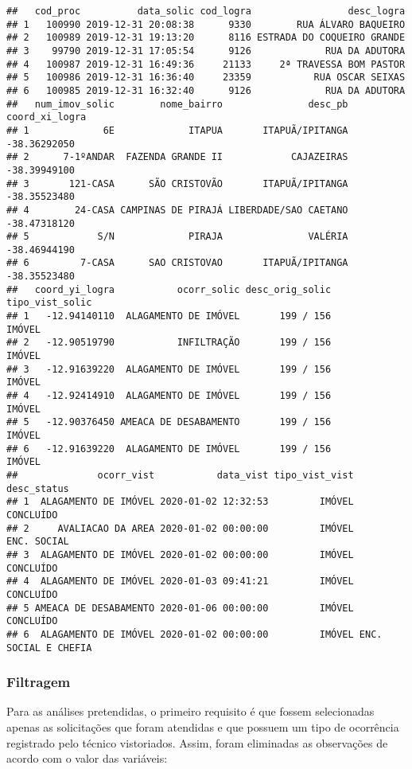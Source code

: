\documentclass[
]{article}
\begin{document}
\begin{verbatim}
##   cod_proc          data_solic cod_logra                 desc_logra
## 1   100990 2019-12-31 20:08:38      9330        RUA ÁLVARO BAQUEIRO
## 2   100989 2019-12-31 19:13:20      8116 ESTRADA DO COQUEIRO GRANDE
## 3    99790 2019-12-31 17:05:54      9126             RUA DA ADUTORA
## 4   100987 2019-12-31 16:49:36     21133     2ª TRAVESSA BOM PASTOR
## 5   100986 2019-12-31 16:36:40     23359           RUA OSCAR SEIXAS
## 6   100985 2019-12-31 16:32:40      9126             RUA DA ADUTORA
##   num_imov_solic        nome_bairro               desc_pb coord_xi_logra
## 1             6E             ITAPUA       ITAPUÃ/IPITANGA   -38.36292050
## 2      7-1ºANDAR  FAZENDA GRANDE II            CAJAZEIRAS   -38.39949100
## 3       121-CASA      SÃO CRISTOVÃO       ITAPUÃ/IPITANGA   -38.35523480
## 4        24-CASA CAMPINAS DE PIRAJÁ LIBERDADE/SAO CAETANO   -38.47318120
## 5            S/N             PIRAJA               VALÉRIA   -38.46944190
## 6         7-CASA      SAO CRISTOVAO       ITAPUÃ/IPITANGA   -38.35523480
##   coord_yi_logra           ocorr_solic desc_orig_solic tipo_vist_solic
## 1   -12.94140110  ALAGAMENTO DE IMÓVEL       199 / 156          IMÓVEL
## 2   -12.90519790           INFILTRAÇÃO       199 / 156          IMÓVEL
## 3   -12.91639220  ALAGAMENTO DE IMÓVEL       199 / 156          IMÓVEL
## 4   -12.92414910  ALAGAMENTO DE IMÓVEL       199 / 156          IMÓVEL
## 5   -12.90376450 AMEACA DE DESABAMENTO       199 / 156          IMÓVEL
## 6   -12.91639220  ALAGAMENTO DE IMÓVEL       199 / 156          IMÓVEL
##              ocorr_vist           data_vist tipo_vist_vist          desc_status
## 1  ALAGAMENTO DE IMÓVEL 2020-01-02 12:32:53         IMÓVEL            CONCLUÍDO
## 2     AVALIACAO DA AREA 2020-01-02 00:00:00         IMÓVEL          ENC. SOCIAL
## 3  ALAGAMENTO DE IMÓVEL 2020-01-02 00:00:00         IMÓVEL            CONCLUÍDO
## 4  ALAGAMENTO DE IMÓVEL 2020-01-03 09:41:21         IMÓVEL            CONCLUÍDO
## 5 AMEACA DE DESABAMENTO 2020-01-06 00:00:00         IMÓVEL            CONCLUÍDO
## 6  ALAGAMENTO DE IMÓVEL 2020-01-02 00:00:00         IMÓVEL ENC. SOCIAL E CHEFIA
\end{verbatim}

\hypertarget{filtragem}{%
\subsubsection{Filtragem}\label{filtragem}}

Para as análises pretendidas, o primeiro requisito é que fossem
selecionadas apenas as solicitações que foram atendidas e que possuem um
tipo de ocorrência registrado pelo técnico vistoriados. Assim, foram
eliminadas as observações de acordo com o valor das variáveis:
\end{document}
